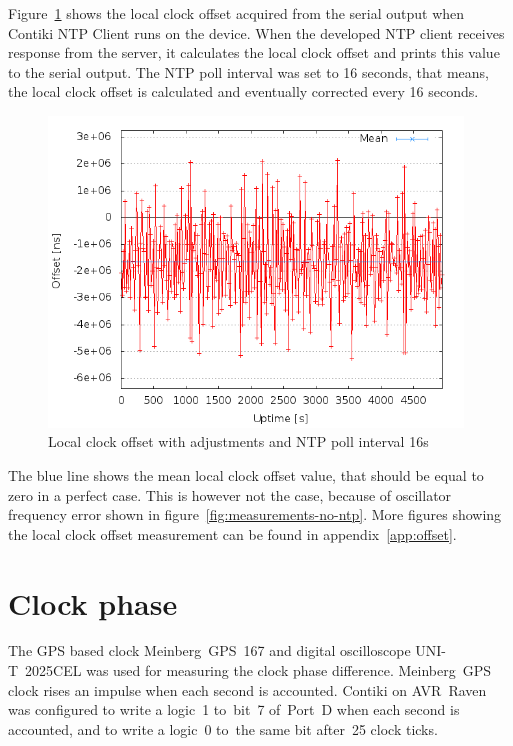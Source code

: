 Figure~\ref{fig:measurements-ntp-serial} shows the local clock offset
acquired from the serial output when Contiki NTP Client runs on the device.
When the developed NTP client receives response from the server,
it calculates the local clock offset and prints this value to the serial output.
The NTP poll interval was set to 16 seconds, that means, the local clock offset
is calculated and eventually corrected every 16 seconds.
\begin{figure}[H]
  \centering
  \includegraphics[width=11cm,keepaspectratio]{fig/poll-16s.png}
  \caption{Local clock offset with adjustments and NTP poll interval 16s}
  \label{fig:measurements-ntp-serial}
\end{figure}
The blue line shows the mean local clock offset value,
that should be equal to zero in a perfect case.
This is however not the case, because of oscillator frequency error
shown in figure~\ref{fig:measurements-no-ntp}.
More figures showing the local clock offset measurement
can be found in appendix~\ref{app:offset}.


\section{Clock phase}
The GPS based clock Meinberg~GPS~167 and digital oscilloscope UNI-T~2025CEL
was used for measuring the clock phase difference.
Meinberg~GPS clock rises an impulse when each second is accounted.
Contiki on AVR~Raven was configured to write a logic~1
to~bit~7 of~Port~D when each second is accounted,
and to write a logic~0 to~the same bit after~25 clock ticks.

